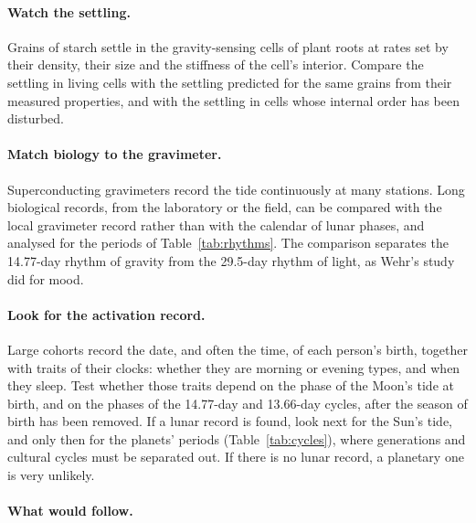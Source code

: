 \documentclass[11pt,a4paper]{article}
\begin{document}
\paragraph{Watch the settling.} Grains of starch settle in the gravity-sensing cells of plant roots at rates set by their density, their size and the stiffness of the cell's interior. Compare the settling in living cells with the settling predicted for the same grains from their measured properties, and with the settling in cells whose internal order has been disturbed. 

\paragraph{Match biology to the gravimeter.} Superconducting gravimeters record the tide continuously at many stations. Long biological records, from the laboratory or the field, can be compared with the local gravimeter record rather than with the calendar of lunar phases, and analysed for the periods of Table~\ref{tab:rhythms}. The comparison separates the 14.77-day rhythm of gravity from the 29.5-day rhythm of light, as Wehr's study did for mood.

\paragraph{Look for the activation record.} Large cohorts record the date, and often the time, of each person's birth, together with traits of their clocks: whether they are morning or evening types, and when they sleep. Test whether those traits depend on the phase of the Moon's tide at birth, and on the phases of the 14.77-day and 13.66-day cycles, after the season of birth has been removed. If a lunar record is found, look next for the Sun's tide, and only then for the planets' periods (Table~\ref{tab:cycles}), where generations and cultural cycles must be separated out. If there is no lunar record, a planetary one is very unlikely.

\paragraph{What would follow.} 
\end{document}
